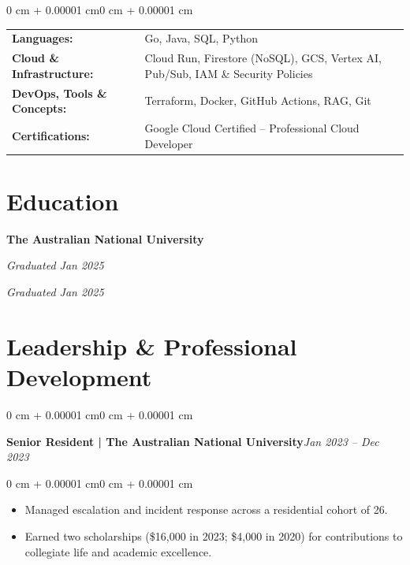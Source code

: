 \documentclass[10pt, letterpaper]{article}
\newenvironment{highlights}{
    \begin{itemize}[
        topsep=0.10 cm,
        parsep=0.10 cm,
        partopsep=0pt,
        itemsep=0pt,
        leftmargin=0 cm + 10pt
    ]
}{
    \end{itemize}
}
\newenvironment{onecolentry}{
    \begin{adjustwidth}{0 cm + 0.00001 cm}{0 cm + 0.00001 cm}
}{
    \end{adjustwidth}
}
\begin{document}
\begin{onecolentry}
    \begin{tabularx}{\linewidth}{@{} l X @{}}
        \textbf{Languages:}           & Go, Java, SQL, Python \\[0.2cm]
        \textbf{Cloud \& Infrastructure:} & Cloud Run, Firestore (NoSQL), GCS, Vertex AI, Pub/Sub, IAM \& Security Policies \\[0.2cm]
        \textbf{DevOps, Tools \& Concepts:}     & Terraform, Docker, GitHub Actions, RAG, Git  \\[0.2cm]
        \textbf{Certifications:}      & Google Cloud Certified – Professional Cloud Developer      \\[0.2cm]
    \end{tabularx}
\end{onecolentry}

\section{Education}
\vspace{0.1cm}

\textbf{The Australian National University}%


\vspace{0.1cm}

\hspace{0.5cm}{Bachelor of Actuarial Studies}\hfill{} \textit{Graduated Jan 2025}

\vspace{0.1cm}

\hspace{0.5cm}{Bachelor of Finance (Quantitative Finance)}\hfill{} \textit{Graduated Jan 2025}

\section{Leadership \& Professional Development}
\vspace{0.1cm}

\begin{onecolentry}
    \textbf{Senior Resident | The Australian National University}\hfill \textit{Jan 2023 – Dec 2023}
\end{onecolentry}

\vspace{0.10 cm}

\begin{onecolentry}
    \begin{highlights}
        \item Managed escalation and incident response across a residential cohort of 26.
        \item Earned two scholarships (\$16,000 in 2023; \$4,000 in 2020) for contributions to collegiate life and academic excellence.
    \end{highlights}
\end{onecolentry}
\end{document}
